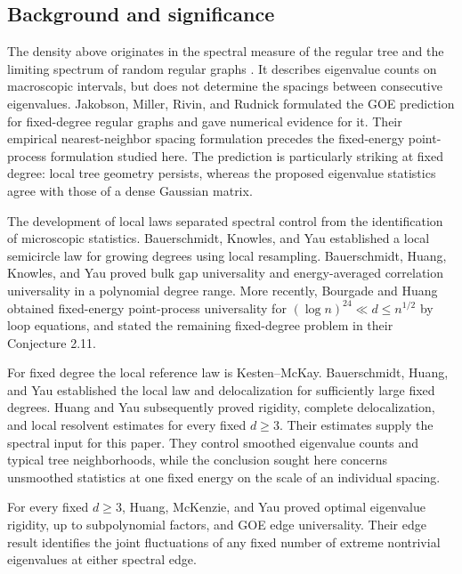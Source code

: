 \subsection{Background and significance}

The density above originates in the spectral measure of the regular
tree and the limiting spectrum of random regular graphs
\cite{Kesten,McKay}.
It describes eigenvalue counts on macroscopic intervals, but does not
determine the spacings between consecutive eigenvalues.
Jakobson, Miller, Rivin, and Rudnick
\cite[Sections~1 and~5]{JakobsonEtAl} formulated the GOE prediction
for fixed-degree regular graphs and gave numerical evidence for it.
Their empirical nearest-neighbor spacing formulation precedes the
fixed-energy point-process formulation studied here.
The prediction is particularly striking at fixed degree: local tree
geometry persists, whereas the proposed eigenvalue statistics agree
with those of a dense Gaussian matrix.

The development of local laws separated spectral control from the
identification of microscopic statistics. Bauerschmidt, Knowles, and
Yau \cite{BauerschmidtKnowlesYauLocal} established a local semicircle
law for growing degrees using local resampling. Bauerschmidt, Huang,
Knowles, and Yau \cite[Theorems 1.1 and 1.2]{BauerschmidtEtAl}
proved bulk gap universality and energy-averaged correlation
universality in a polynomial degree range. More recently, Bourgade
and Huang \cite[Proposition 2.10]{BourgadeHuang} obtained fixed-energy
point-process universality for
\((\log n)^{24}\ll d\le n^{1/2}\) by loop equations, and stated the
remaining fixed-degree problem in their Conjecture 2.11.

For fixed degree the local reference law is Kesten--McKay.
Bauerschmidt, Huang, and Yau \cite{BauerschmidtHuangYauLocal}
established the local law and delocalization for sufficiently large
fixed degrees. Huang and Yau \cite{HuangYau} subsequently proved
rigidity, complete delocalization, and local resolvent estimates for
every fixed \(d\ge3\). Their estimates supply the spectral input for
this paper. They control smoothed eigenvalue counts and typical tree
neighborhoods, while the conclusion sought here concerns unsmoothed
statistics at one fixed energy on the scale of an individual spacing.

For every fixed \(d\ge3\), Huang, McKenzie, and Yau
\cite[Theorems~1.1 and~1.2]{HuangMcKenzieYau}
proved optimal eigenvalue rigidity, up to subpolynomial factors,
and GOE edge universality.
Their edge result identifies the joint fluctuations of any fixed
number of extreme nontrivial eigenvalues at either spectral edge.


